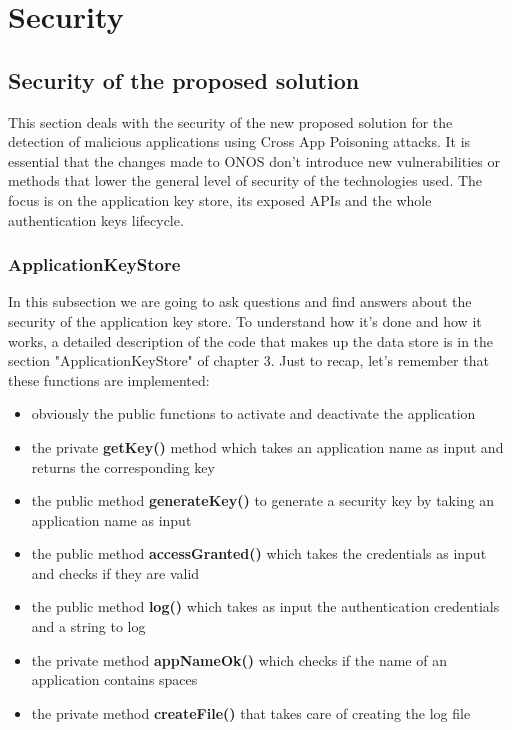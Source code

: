\chapter{Security}

\section{Security of the proposed solution}

This section deals with the security of the new proposed solution for the detection of malicious applications using Cross App Poisoning attacks. It is essential that the changes made to ONOS don't introduce new vulnerabilities or methods that lower the general level of security of the technologies used. The focus is on the application key store, its exposed APIs and the whole authentication keys lifecycle.

\subsection{ApplicationKeyStore}

In this subsection we are going to ask questions and find answers about the security of the application key store. To understand how it's done and how it works, a detailed description of the code that makes up the data store is in the section "ApplicationKeyStore" of chapter 3. Just to recap, let's remember that these functions are implemented:
\begin{itemize}
\item obviously the public functions to activate and deactivate the application
\item the private \textbf{getKey()} method which takes an application name as input and returns the corresponding key
\item the public method \textbf{generateKey()} to generate a security key by taking an application name as input
\item the public method \textbf{accessGranted()} which takes the credentials as input and checks if they are valid
\item the public method \textbf{log()} which takes as input the authentication credentials and a string to log
\item the private method \textbf{appNameOk()} which checks if the name of an application contains spaces
\item the private method \textbf{createFile()} that takes care of creating the log file
\end{itemize}

